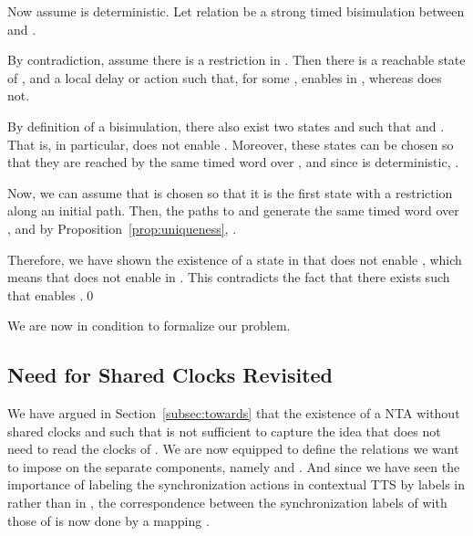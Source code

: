 \documentclass{LMCS}
\theoremstyle{plain}\newtheorem*{prop11}{Proposition~\ref{prop:states} bis}
\begin{document}
  \noindent Now assume  is deterministic.
  Let relation  be a strong timed bisimulation between  and
  . 

  By contradiction, assume there is a restriction in . Then
  there is a reachable state  of , and a local
  delay or action  such that, for
  some ,  enables  in
  , whereas  does not.

  By definition of a bisimulation, there also exist two states
   and  such that
   and . That
  is, in particular,  does not enable .
Moreover, these states can be chosen so that they are reached by the same
  timed word over , and since
   is deterministic, .


  Now, we can assume that  is chosen so that it is the first state
  with a restriction along an initial path. Then, the paths to  and
   generate the same timed word over
  , and by
  Proposition~\ref{prop:uniqueness}, . 

  Therefore, we have shown the existence of a state  in
   that does not enable , which means
  that  does not enable  in .
  This contradicts the fact that there exists  such that
   enables .\qed

We are now in condition to formalize our problem.


\subsection{Need for Shared Clocks Revisited}\label{subsec:nsc}                We have argued in Section~\ref{subsec:towards} that the existence of a
NTA  without shared clocks and such that
 is not sufficient to
capture the idea that  does not need to read the clocks of .
We are now equipped to define the relations we want to impose
on the separate components, namely
 and
.
And since we have seen the importance of labeling the synchronization
actions in contextual TTS by labels in  rather than in
, the correspondence between the synchronization labels of  with those of  is now done by a mapping
.
\end{document}
